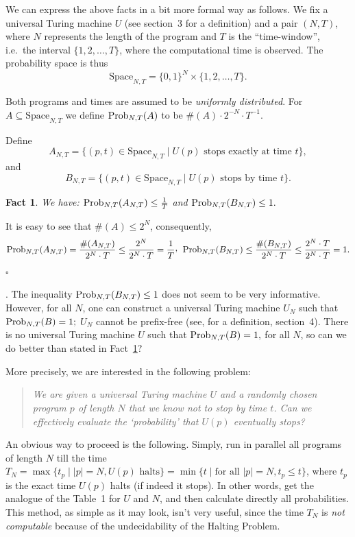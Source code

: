 \documentclass[12pt,twoside,openright]{report}
\newcommand{\QED}{\hfill $\square$}
\newcommand{\Prob}{{\rm Prob}}
\newtheorem{fact}[thm]{Fact}
\newcommand{\myproof}{\noindent {\em Proof.}  }
\newcommand{\Space}{\mbox{Space}}
\begin{document}
We can express the above facts in a bit more formal way as follows.  We fix a universal Turing machine $U$ (see section~3 for a definition) 
and a pair $(N,T)$, where $N$ represents the length of the program and $T$ is the ``time-window'', i.e.\ the interval $\{1,2,\ldots ,T\}$, where the computational time is observed.  The probability space is thus \[\Space_{N,T} = \{0, 1\}^{N} \times \{1,2,\ldots ,T\}.\]

Both programs and times are assumed to be {\it uniformly distributed}. For $A \subseteq \Space_{N,T}$ we define  $\Prob_{N,T}(A)$ to be $\#(A)\cdot 2^{-N} \cdot T^{-1}$.

\medskip


Define
\[A_{N,T} = \{(p,t)\in \Space_{N,T}  \mid U(p) \mbox{ stops exactly at time $t$}\},\]
\noindent and
\[B_{N,T} = \{(p,t)\in \Space_{N,T}  \mid U(p) \mbox{ stops  by time $t$}\}.\]




\medskip

\begin{fact}
\label{prel}  We have: $\Prob_{N,T}(A_{N,T})  \le  \frac{1}{T}$ and  $\Prob_{N,T}(B_{N,T}) \le  1.$ 
\end{fact}

\myproof It is easy to see that $\# (A) \le 2^{N}$, consequently,
$$\Prob_{N,T}(A_{N,T}) = \frac{\#(A_{N,T})}{2^{N} \cdot T} \le \frac{2^{N}}{2^{N} \cdot T} = \frac{1}{T}\raisebox{0.4ex}{,} \phantom{x} \Prob_{N,T}(B_{N,T}) \le \frac{\#(B_{N,T})}{2^{N} \cdot T}\le  \frac{2^{N} \cdot T}{2^{N} \cdot T} = 1.$$   \QED

\medskip

. The inequality  $\Prob_{N,T}(B_{N,T}) \le  1$ does not seem to be very informative. However, for all $N$, one can construct a universal Turing machine $U_N$ such that $\Prob_{N,T}(B) = 1;$  $U_{N}$ cannot be prefix-free (see, for a definition,  section~4).  There is no universal Turing machine  $U$ such that $\Prob_{N,T}(B) = 1, $ for all $N$, so  can we do better than stated in Fact~\ref{prel}?


More precisely, we are interested in the following problem: 
\begin{quote} \it We are given a universal Turing machine $U$ and a randomly chosen program $p$ of length $N$ that we know  not to stop by time $t$. Can we effectively evaluate the `probability' that $U(p)$ eventually stops? 
\end{quote}

An obvious way to proceed is the following. Simply, run in parallel all programs of length $N$ till the time  $T_{N} = \max\{t_{p} \mid  |p|=N, U(p) \mbox{  halts} \} = \min\{t\mid \mbox{for all } |p|=N, t_{p} \le t\}$, where $t_{p} $ is the exact time $U(p)$ halts (if indeed it stops). In other words, get the analogue of the Table~1 for $U$ and $N$, and then calculate directly all probabilities. This method, as simple as it may look, isn't very useful, since the time $T_{N}$ is {\it not computable}   because of the undecidability of the Halting Problem.
\end{document}
